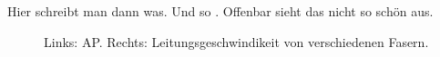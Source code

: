 

Hier schreibt man dann was. Und so . Offenbar sieht das nicht so schön aus.


\begin{figure}[ht]
  \hfill
  \caption[Aktionspotential und Leitungsgeschwindikeit]{Links:
    AP. Rechts: Leitungsgeschwindikeit von verschiedenen Fasern.}
\label{fig:ap_leitung}
\end{figure}



